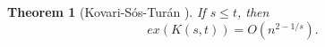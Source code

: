 \documentclass[12pt,twoside,a4paper]{book}
\numberwithin{equation}{section}
\newtheorem{theorem}             {Theorem}[section]
\newtheorem{corollary}	[theorem] {Corollary}
\theoremstyle{remark}
\begin{document}



\begin{theorem}[{Kovari-Sós-Turán \cite{KoSoTu54}}]
If $s \leq t$, then
$$ ex(K(s,t)) = O (n^{2 - 1/s}). $$
\end{theorem}
\end{document}

